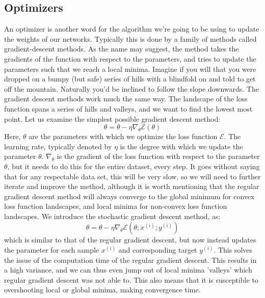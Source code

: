 \documentclass[12pt]{article}
\begin{document}
{\subsection{Optimizers} \label{opt}
An optimizer is another word for the algorithm we're going to be using to update the weights of our networks. Typically this is done by a family of methods called gradient-descent methods. As the name may suggest, the method takes the gradients of the function with respect to the parameters, and tries to update the parameters such that we reach a local minima. \newline Imagine if you will that you were dropped on a bumpy (but safe) series of hills with a blindfold on and told to get off the mountain. Naturally you'd be inclined to follow the slope downwards. The gradient descent methods work much the same way. The landscape of the loss function spans a series of hills and valleys, and we want to find the lowest most point.
\newline
Let us examine the simplest possible gradient descent method:
\begin{equation*}
    \theta = \theta - \eta \nabla_\theta \mathcal{E}(\theta)
\end{equation*}
Here, $\theta$ are the parameters with which we optimize the loss function $\mathcal{E}$. The learning rate, typically denoted by $\eta$ is the degree with which we update the parameter $\theta$. $\nabla_\theta$ is the gradient of the loss function with respect to the parameter $\theta$, but it needs to do this for the entire dataset, every step. It goes without saying that for any respectable data set, this will be very slow, so we will need to further iterate and improve the method, although it is worth mentioning that the regular gradient descent method will always converge to the global minimum for convex loss function landscapes, and local minima for non-convex loss function landscapes.
\newline
We introduce the stochastic gradient descent method, as:
\begin{equation*}
    \theta = \theta - \eta \nabla_\theta \mathcal{E}(\theta; x^{(i)}; y^{(i)})
\end{equation*}
which is similar to that of the regular gradient descent, but now instead updates the parameter for each sample $x^{(i)}$ and corresponding target $y^{(i)}$. This solves the issue of the computation time of the regular gradient descent. This results in a high variance, and we can thus even jump out of local minima 'valleys' which regular gradient descent was not able to. This also means that it is susceptible to overshooting local or global minima, making convergence time.
}
\end{document}
